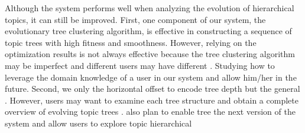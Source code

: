 Although the system performs well when analyzing the evolution of hierarchical topics, it can still be improved.
First, one component of our system, the evolutionary tree clustering algorithm, is effective in constructing a sequence of topic trees with high fitness and smoothness.
However, relying  on the optimization results is not always effective because the tree clustering algorithm may be imperfect and different users may have different .
Studying how to leverage the domain knowledge of a user in our system and allow him/her 
 in the future.
Second, we only  the horizontal offset to encode tree depth but  the general  .
However, users may want to examine each tree structure and obtain a complete overview of evolving topic trees .
 also plan to enable tree  the next version of the system and allow users to  explore topic hierarchical 



